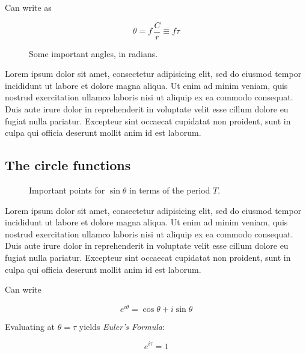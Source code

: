 \documentclass{article}
\begin{document}
Can write as

\[ \theta = f\,\frac{C}{r} \equiv f\tau \]

\begin{figure}
\begin{center}
\end{center}
\caption{Some important angles, in radians.\label{fig:tau-angles}}
\end{figure}

Lorem ipsum dolor sit amet, consectetur adipisicing elit, sed do eiusmod tempor incididunt ut labore et dolore magna aliqua. Ut enim ad minim veniam, quis nostrud exercitation ullamco laboris nisi ut aliquip ex ea commodo consequat. Duis aute irure dolor in reprehenderit in voluptate velit esse cillum dolore eu fugiat nulla pariatur. Excepteur sint occaecat cupidatat non proident, sunt in culpa qui officia deserunt mollit anim id est laborum.

  \subsection{The circle functions} %
  \label{sec:the_circle_functions}

\begin{figure}
\begin{center}
\end{center}
\caption{Important points for $\sin\theta$ in terms of the period $T$.\label{fig:sine-with-tau}}
\end{figure}

Lorem ipsum dolor sit amet, consectetur adipisicing elit, sed do eiusmod tempor incididunt ut labore et dolore magna aliqua. Ut enim ad minim veniam, quis nostrud exercitation ullamco laboris nisi ut aliquip ex ea commodo consequat. Duis aute irure dolor in reprehenderit in voluptate velit esse cillum dolore eu fugiat nulla pariatur. Excepteur sint occaecat cupidatat non proident, sunt in culpa qui officia deserunt mollit anim id est laborum.
  


Can write

\[ e^{i\theta} = \cos\theta + i\sin\theta \]

Evaluating at $\theta = \tau$ yields \emph{Euler's Formula}:

\[ e^{i\tau} = 1 \]
\end{document}
